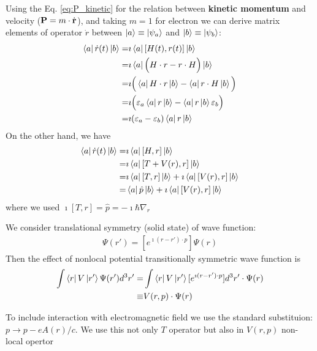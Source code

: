 \documentclass[11pt]{article}
\begin{document}
Using  the Eq. \ref{eq:P_kinetic}  for the relation between {\bf kinetic  momentum} and velocity ($\vb P=m\cdot\dot{\vb r}$), and taking  $m=1$ for electron we  can derive matrix elements of operator $\dot r$  between $\ket{a}\equiv \ket{ \psi_a}$ and  $\ket{b}\equiv \ket{ \psi_b}$:
\begin{align*}
 \bra{a} \dot r(t) \ket{b}  =&\imath  \bra{a} [H(t),r(t)] \ket{b} \\
   =& \imath  \bra{a} \Big(  H \cdot r - r \cdot H \Big) \ket{b}  \\
   =& \imath  \Big(  \bra{a} H \cdot r \ket{b} - \bra{a} r \cdot H  \ket{b} \Big)  \\
   =&  \imath \Big(\varepsilon_a \bra{a} r\ket{b} -  \bra{a} r\ket{b} \varepsilon_b    \Big) \\
   =&   \imath (\varepsilon_a -\varepsilon_b) \bra{a} r\ket{b}
\end{align*} 
On the other hand, we have 
\begin{align*}
 \bra{a} \dot r(t) \ket{b}   = &  \imath  \bra{a} [H,r] \ket{b} \\ 
 =& \imath  \bra{a} [T + V(r) , r] \ket{b}  \\
  =& \imath \bra{a} [T  , r] \ket{b}   +  \imath \bra{a} [V(r), r] \ket{b}    \\
  = &   \bra{a} \hat p \ket{b}  +  \imath \bra{a} [V(r), r] \ket{b}
\end{align*}  
where we used $\imath [T,r] = \hat p = - \imath  \hbar \nabla_r$

We consider translational  symmetry (solid state)  of  wave function:
\begin{align*}
    \Psi(r') = [  e^{ \imath (r-r') \cdot p } ] \Psi(r) 
\end{align*}
Then the effect of  nonlocal potential transitionally symmetric wave function is
\begin{align*}
    \int \bra{r} V \ket{r'} \Psi(r') d^3r' = & 
      \int \bra{r} V \ket{r'}  [ e^{ \imath (r-r') \cdot p } ] d^3r'  \cdot \Psi(r) \\
      \equiv & V(r,p) \cdot  \Psi(r)
\end{align*}

To include interaction with electromagnetic field  we  use  the standard substituion:
$p \to p -e A(r)/c$.  We use this not only $T$ operator but also in $V(r,p)$ non-local opertor

\end{document}
